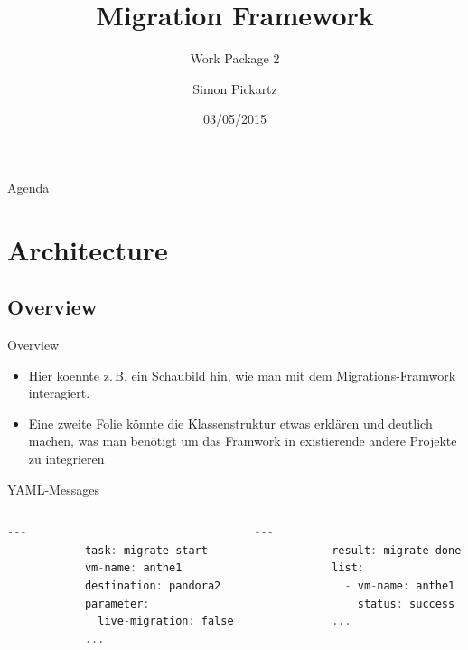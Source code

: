 \documentclass[10pt, aspectratio=1610]{beamer}
\title{Migration Framework}
\subtitle{Work Package 2}
\author{Simon Pickartz}
\institute[]{The \fast Project}
\date{03/05/2015}
\begin{document}

\begin{frame}{Agenda}
	\tableofcontents
\end{frame}

\section{Architecture}
\subsection{Overview}
\begin{frame}{Overview}
	\begin{itemize}
		\item Hier koennte z.\,B. ein Schaubild hin, wie man mit dem Migrations-Framwork interagiert.
		\item Eine zweite Folie könnte die Klassenstruktur etwas erklären und deutlich machen, was man benötigt um das Framwork in existierende andere Projekte zu integrieren
	\end{itemize}
\end{frame}

\begin{frame}[fragile]{YAML-Messages}
	\begin{columns}[T]
		\begin{column}{.40\textwidth}
			\begin{lstlisting}[basicstyle=\ttfamily, language=C]
			---
			task: migrate start
			vm-name: anthe1
			destination: pandora2
			parameter:
			  live-migration: false
			...
			\end{lstlisting}
		\end{column}
		\begin{column}{.40\textwidth}
			\begin{lstlisting}[basicstyle=\ttfamily, language=C]
			---
			result: migrate done
			list:
			  - vm-name: anthe1
			    status: success
			...
			\end{lstlisting}
		\end{column}
	\end{columns}
\end{frame}
\end{document}
